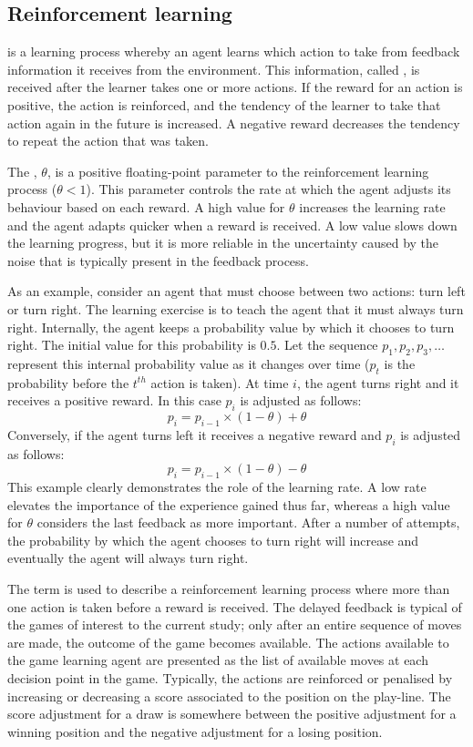 \subsection{Reinforcement learning}
 \cite{sutton:learning} is a learning process whereby an agent learns which action to take from feedback information it receives from the environment.  This information, called , is received after the learner takes one or more actions. If the reward for an action is positive, the action is reinforced, and the tendency of the learner to take that action again in the future is increased. A negative reward decreases the tendency to repeat the action that was taken.  

The , $\theta$, is a positive floating-point parameter to the reinforcement learning process ($\theta < 1$).   This parameter controls the rate at which the agent adjusts its behaviour based on each reward.  A high value for  $\theta$ increases the learning rate and the agent adapts quicker when a reward is received. A low value slows down the learning progress, but it is more reliable in the uncertainty caused by the noise that is typically present in the feedback process.     

As an example, consider an agent that must choose between two actions: turn left or turn right. The learning exercise is to teach the agent that it must always turn right. Internally, the agent keeps a probability value by which it chooses to turn right.  The initial value for this probability is $0.5$. Let the sequence $p_1,p_2,  p_3,\ldots $ represent this internal probability value as it changes over time ($p_t$ is the probability before the $t^{th}$ action is taken). At time $i$, the agent turns right and it receives a positive reward. In this case $p_i$ is adjusted as follows:
\[ p_i = p_{i-1} \times (1-\theta) + \theta \]
Conversely, if the agent turns left it receives a negative reward and $p_i$ is adjusted as follows:
\[ p_i = p_{i-1} \times (1-\theta) - \theta \]
This example clearly demonstrates the role of the learning rate.  A low rate elevates the importance of the experience gained thus far, whereas a high value for $\theta$ considers the last feedback as more important. After a number of attempts, the probability by which the agent chooses to turn right will increase and eventually the agent will always turn right. 

The term  is used to describe a reinforcement learning process where more than one action is taken before a reward is received. The delayed feedback is typical of the games of interest to the current study; only after an entire sequence of moves are made, the outcome of the game becomes available. The actions available to the game learning agent are presented as the list of available moves at each decision point in the game. Typically, the actions are reinforced or penalised by increasing or decreasing a score associated to the position on the play-line. The score adjustment for a draw is somewhere between the positive adjustment for a winning position and the negative adjustment for a losing position.  

